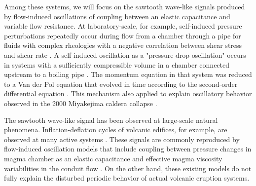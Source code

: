 \documentclass[aps,pre,preprint,groupedaddress,showkeys]{revtex4-2}
\begin{document}
Among these systems, we will focus on the sawtooth wave-like signals produced by flow-induced oscillations of coupling between an elastic capacitance and variable flow resistance.
At laboratory-scale, for example, self-induced pressure perturbations repeatedly occur during flow from a chamber through a pipe for fluids with complex rheologies with a negative correlation between shear stress and shear rate \citep{DenDoelder1998, Malkin2010}.
A self-induced oscillation as a "pressure drop oscillation" occurs in systems with a sufficiently compressible volume in a chamber connected upstream to a boiling pipe \citep{Ozawa1979, Kakac2008}.
The momentum equation in that system was reduced to a Van der Pol equation that evolved in time according to the second-order differential equation \citep{Kanamaru2007}.
This mechanism also applied to explain oscillatory behavior observed in the 2000 Miyakejima caldera collapse \citep{Fujita2004}.

The sawtooth wave-like signal has been observed at large-scale natural phenomena.
Inflation-deflation cycles of volcanic edifices, for example, are observed at many active systems \citep{Fujita2004, Iguchi2008, Genco2010}.
These signals are commonly reproduced by flow-induced oscillation models that include coupling between pressure changes in magma chamber as an elastic capacitance and effective magma viscosity variabilities in the conduit flow \citep{Melnik2005b, Kozono2012}.
On the other hand, these existing models do not fully explain the disturbed periodic behavior of actual volcanic eruption systems.
\end{document}
